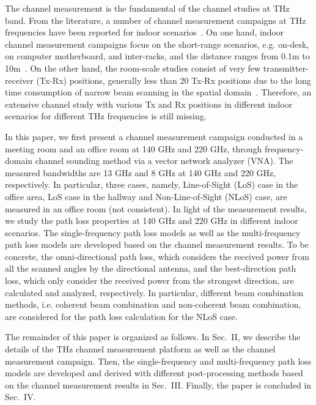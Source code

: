 \documentclass[conference]{IEEEtran}
\begin{document}
The channel measurement is the fundamental of the channel studies at THz band. From the literature, a number of channel measurement campaigns at THz frequencies have been reported for indoor scenarios~\cite{yu2020wideband,yi2021Channel,xing2019indoor,kim2016characterization,eckhardt2019measurements,cheng2020thz,fu2020modeling,abbasi2020channel,song2020channel,serghiou2020ultra,nguyen2018comparing}. On one hand, indoor channel measurement campaigns focus on the short-range scenarios, e.g. on-desk, on computer motherboard, and inter-racks, and the distance ranges from 0.1m to 10m~\cite{kim2016characterization,eckhardt2019measurements,cheng2020thz,fu2020modeling,xing2019indoor,song2020channel}. On the other hand, the room-scale studies consist of very few transmitter-receiver (Tx-Rx) positions, generally less than 20 Tx-Rx positions due to the long time consumption of narrow beam scanning in the spatial domain~\cite{xing2019indoor,song2020channel,abbasi2020channel,serghiou2020ultra,nguyen2018comparing}. Therefore, an extensive channel study with various Tx and Rx positions in different indoor scenarios for different THz frequencies is still missing.  

\par In this paper, we first present a channel measurement campaign conducted in a meeting room and an office room at 140 GHz and 220 GHz, through frequency-domain channel sounding method via a vector network analyzer (VNA). The measured bandwidths are 13 GHz and 8 GHz at 140 GHz and 220 GHz, respectively. In particular, three cases, namely, Line-of-Sight (LoS) case in the office area, LoS case in the hallway and Non-Line-of-Sight (NLoS) case, are measured in an office room (not consistent). In light of the measurement results, we study the path loss properties at 140 GHz and 220 GHz in different indoor scenarios. The single-frequency path loss models as well as the multi-frequency path loss models are developed based on the channel measurement results. To be concrete, the omni-directional path loss, which considers the received power from all the scanned angles by the directional antenna, and the best-direction path loss, which only consider the received power from the strongest direction, are calculated and analyzed, respectively. In particular, different beam combination methods, i.e. coherent beam combination and non-coherent beam combination, are considered for the path loss calculation for the NLoS case.
\par The remainder of this paper is organized as follows. In Sec.~II, we describe the details of the THz channel measurement platform as well as the channel measurement campaign. Then, the single-frequency and multi-frequency path loss models are developed and derived with different post-processing methods based on the channel measurement results in Sec.~III. Finally, the paper is concluded in Sec.~IV.
\end{document}
